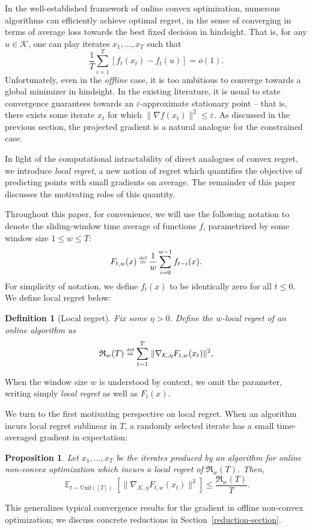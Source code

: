 \documentclass{article}
\def\norm#1{\mathopen\| #1 \mathclose\|}
\newcommand{\equaldef}{\stackrel{\text{\tiny def}}{=}}
\newcommand{\K}{\ensuremath{\mathcal K}}
\def\eps{\varepsilon}
\newcommand{\bra}[1]{\left[#1\right]}
\DeclareMathOperator*{\E}{\mathbb{E}}
\newtheorem{definition}[theorem]{Definition}
\newtheorem{proposition}[theorem]{Proposition}
\renewcommand{\K}{\mathcal{K}}
\newcommand{\regret}{\mathfrak{R}}
\begin{document}
In the well-established framework of online convex optimization, numerous algorithms can efficiently achieve optimal regret, in the sense of converging in terms of average loss towards the best fixed decision in hindsight. That is, for any $u \in \K$, one can play iterates $x_1, \ldots, x_T$ such that
\begin{equation*}
\frac{1}{T} \sum_{i=1}^T \bra{ f_t(x_t) - f_t(u) } = o(1).
\end{equation*}
Unfortunately, even in the \emph{offline} case, it is too ambitious to converge towards a global minimizer in hindsight. In the existing literature, it is usual to state convergence guarantees towards an $\eps$-approximate stationary point -- that is, there exists some iterate $x_t$ for which $\norm{\nabla f(x_t)}^2 \leq \eps$. As discussed in the previous section, the projected gradient is a natural analogue for the constrained case.

In light of the computational intractability of direct analogues of convex regret, we introduce \emph{local regret}, a new notion of regret which quantifies the objective of predicting points with small gradients on average. The remainder of this paper discusses the motivating roles of this quantity.

Throughout this paper, for convenience, we will use the following notation to denote the sliding-window time average of functions $f$, parametrized by some window size $1 \leq w \leq T$:
\begin{equation*}
F_{t,w}(x) \equaldef \frac{1}{w} \sum_{i=0}^{w-1} f_{t-i}(x).
\end{equation*}
For simplicity of notation, we define $f_t(x)$ to be identically zero for all $t \leq 0$. We define local regret below:

\begin{definition}[Local regret]
Fix some $\eta > 0$. Define the \emph{$w$-local regret} of an online algorithm as
\begin{equation*}
\regret_w(T) \equaldef \sum_{t=1}^T \; \norm{ \nabla_{\K, \eta} F_{t,w}(x_t) }^2,
\end{equation*}
\end{definition}

When the window size $w$ is understood by context, we omit the parameter, writing simply \emph{local regret} as well as $F_t(x)$.

We turn to the first motivating perspective on local regret. When an algorithm incurs local regret sublinear in $T$, a randomly selected iterate has a small time-averaged gradient in expectation:
\begin{proposition}
\label{regret-to-convergence}
Let $x_1, \ldots, x_T$ be the iterates produced by an algorithm for online non-convex optimization which incurs a local regret of $\regret_w(T)$. Then,
\begin{equation*}
\E_{t \sim \mathrm{Unif}([T])}\bra{ \norm{ \nabla_{\K, \eta} F_{t,w}(x_t) }^2 } \leq \frac{\regret_w(T)}{T}.
\end{equation*}
\end{proposition}
This generalizes typical convergence results for the gradient in offline non-convex optimization; we discuss concrete reductions in Section~\ref{reduction-section}.
\end{document}
